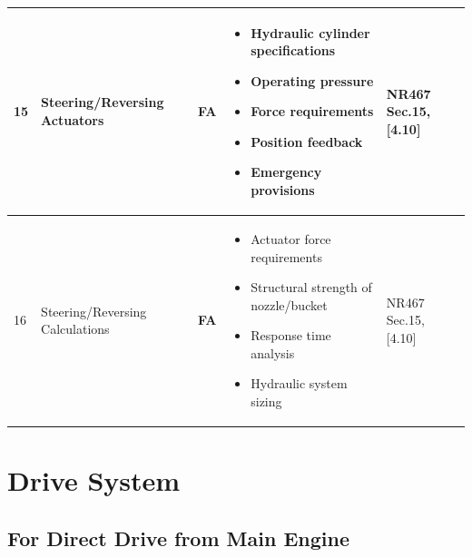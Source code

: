 \documentclass[11pt,a4paper]{report}
\newcommand{\fa}{\textbf{\textcolor{warningred}{FA}}}
\begin{document}
\begin{longtable}{|p{0.5cm}|p{5cm}|p{1.5cm}|p{5.5cm}|p{2cm}|}
15 & Steering/Reversing Actuators & \fa{} & 
\begin{itemize}[leftmargin=*,nosep]
\item Hydraulic cylinder specifications
\item Operating pressure
\item Force requirements
\item Position feedback
\item Emergency provisions
\end{itemize} & NR467 Sec.15, [4.10] \\
\hline

16 & Steering/Reversing Calculations & \fa{} & 
\begin{itemize}[leftmargin=*,nosep]
\item Actuator force requirements
\item Structural strength of nozzle/bucket
\item Response time analysis
\item Hydraulic system sizing
\end{itemize} & NR467 Sec.15, [4.10] \\
\hline

\end{longtable}

\section{Drive System}

\subsection{For Direct Drive from Main Engine}
\end{document}

